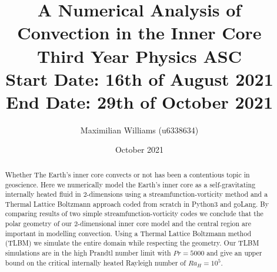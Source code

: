 \documentclass{article}
\title{%
  A Numerical Analysis of Convection in the Inner Core \\
  \large Third Year Physics ASC  \\
    Start Date: 16th of August 2021 End Date: 29th of October 2021}
\author{Maximilian Williams (u6338634)}
\date{October 2021}
\begin{document}
\maketitle

\begin{abstract}

	\noindent Whether The Earth's inner core convects or not has been a contentious topic 
	in geoscience. Here we numerically model the Earth's inner core as a self-gravitating 
	internally heated fluid 
	in 2-dimensions using a streamfunction-vorticity method and a Thermal Lattice Boltzmann 
	approach coded from scratch in Python3 and goLang. By 
	comparing results of two simple 
	streamfunction-vorticity codes we conclude that the polar geometry of our 2-dimensional
	inner core model and the central region are important in 
	modelling convection. Using a Thermal Lattice Boltzmann method (TLBM) we simulate the 
	entire domain while respecting the geometry. Our TLBM simulations are in the high 
	Prandtl number limit with $Pr=5000$ and give an upper bound on the critical internally 
	heated Rayleigh number of $Ra_H = 10^5$. 
 
\end{abstract}
\end{document}
